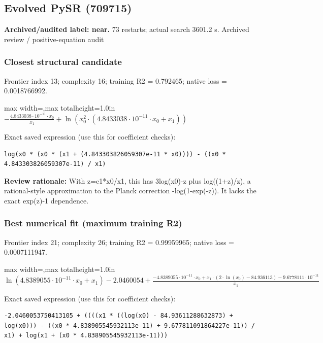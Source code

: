 \documentclass[10pt,letterpaper,landscape]{article}
\begin{document}
\begin{minipage}[t]{0.485\textwidth}
\subsection*{Evolved PySR (709715)}
\textbf{Archived/audited label: near.} 73 restarts; actual search 3601.2 s.
{\small Archived review / positive-equation audit}
\subsubsection*{Closest structural candidate}
Frontier index 13; complexity 16; training R2 = 0.792465; native loss = 0.0018766992.
\begin{center}\begin{adjustbox}{max width=\linewidth,max totalheight=1.0in}$\displaystyle - \frac{4.8433038 \cdot 10^{-11} \cdot x_{0}}{x_{1}} + \ln{\left(x_{0}^{2} \cdot \left(4.8433038 \cdot 10^{-11} \cdot x_{0} + x_{1}\right) \right)}$\end{adjustbox}\end{center}
{\scriptsize Exact saved expression (use this for coefficient checks):}
\begin{lstlisting}
log(x0 * (x0 * (x1 + (4.843303826059307e-11 * x0)))) - ((x0 * 4.843303826059307e-11) / x1)
\end{lstlisting}
{\small\textbf{Review rationale:} With z=c1*x0/x1, this has 3log(x0)-z plus log((1+z)/z), a rational-style approximation to the Planck correction -log(1-exp(-z)). It lacks the exact exp(z)-1 dependence.}
\subsubsection*{Best numerical fit (maximum training R2)}
Frontier index 21; complexity 26; training R2 = 0.99959965; native loss = 0.0007111947.
\begin{center}\begin{adjustbox}{max width=\linewidth,max totalheight=1.0in}$\displaystyle \ln{\left(4.8389055 \cdot 10^{-11} \cdot x_{0} + x_{1} \right)} - 2.0460054 + \frac{- 4.8389055 \cdot 10^{-11} \cdot x_{0} + x_{1} \cdot \left(2 \cdot \ln{\left(x_{0} \right)} - 84.936113\right) - 9.6778111 \cdot 10^{-11}}{x_{1}}$\end{adjustbox}\end{center}
{\scriptsize Exact saved expression (use this for coefficient checks):}
\begin{lstlisting}
-2.0460053750413105 + ((((x1 * ((log(x0) - 84.93611288632873) + log(x0))) - ((x0 * 4.838905545932113e-11) + 9.677811091864227e-11)) / x1) + log(x1 + (x0 * 4.838905545932113e-11)))
\end{lstlisting}
\end{minipage}
\clearpage{}\label{planck-10008}
\end{document}
